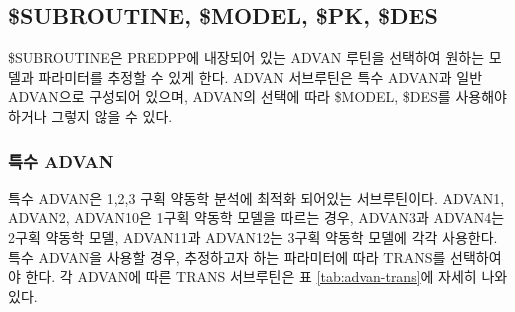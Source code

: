 \documentclass[
  10pt,
  krantz2,
  a4paper]{krantz}
\theoremstyle{definition}
\theoremstyle{definition}
\theoremstyle{definition}
\theoremstyle{remark}
\begin{document}
\hypertarget{subroutine-model-pk-des}{%
\subsection{\$SUBROUTINE, \$MODEL, \$PK, \$DES}\label{subroutine-model-pk-des}}

\$SUBROUTINE은 PREDPP에 내장되어 있는 ADVAN 루틴을 선택하여 원하는 모델과 파라미터를 추정할 수 있게 한다. ADVAN 서브루틴은 특수 ADVAN과 일반 ADVAN으로 구성되어 있으며, ADVAN의 선택에 따라 \$MODEL, \$DES를 사용해야 하거나 그렇지 않을 수 있다.

\hypertarget{uxd2b9uxc218-advan}{%
\subsubsection{\texorpdfstring{특수 ADVAN}{특수 ADVAN}}\label{uxd2b9uxc218-advan}}

특수 ADVAN은 1,2,3 구획 약동학 분석에 최적화 되어있는 서브루틴이다. ADVAN1, ADVAN2, ADVAN10은 1구획 약동학 모델을 따르는 경우, ADVAN3과 ADVAN4는 2구획 약동학 모델, ADVAN11과 ADVAN12는 3구획 약동학 모델에 각각 사용한다. 특수 ADVAN을 사용할 경우, 추정하고자 하는 파라미터에 따라 TRANS를 선택하여야 한다. 각 ADVAN에 따른 TRANS 서브루틴은 표 \ref{tab:advan-trans}에 자세히 나와있다.
\end{document}
